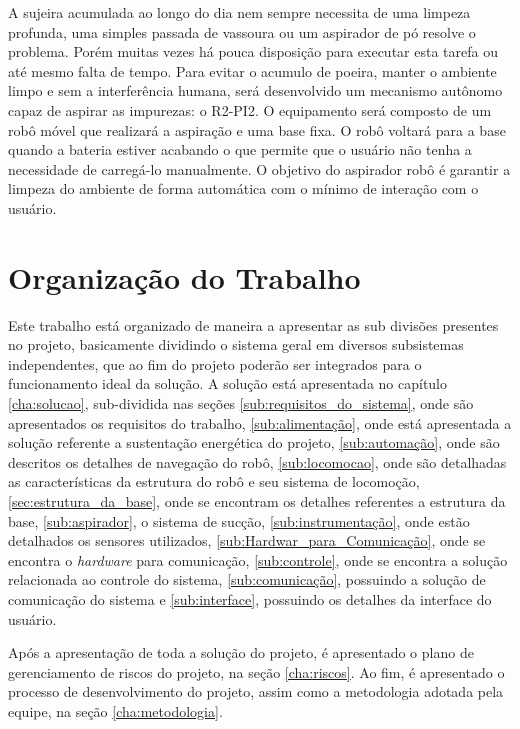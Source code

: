 A sujeira acumulada ao longo do dia nem sempre necessita de uma limpeza profunda, uma simples
passada de vassoura ou um aspirador de pó resolve o problema. Porém muitas vezes há pouca
disposição para executar esta tarefa ou até mesmo falta de tempo. Para evitar o acumulo de
poeira, manter o ambiente limpo e sem a interferência humana, será desenvolvido um mecanismo 
autônomo capaz de aspirar as impurezas: o R2-PI2. O equipamento será composto de um robô móvel que realizará a aspiração e uma base fixa. O robô voltará para a base quando a bateria estiver acabando o que permite que o usuário não tenha a necessidade de carregá-lo manualmente. O objetivo do aspirador robô é garantir a limpeza do ambiente de forma automática com o mínimo de interação com o usuário.











\section{Organização do Trabalho} %
\label{sub:organização_do_trabalho}
	
	Este trabalho está organizado de maneira a apresentar as sub divisões presentes no projeto, basicamente dividindo o sistema geral em diversos subsistemas independentes, que ao fim do projeto poderão ser integrados para o funcionamento ideal da solução. A solução está apresentada no capítulo \ref{cha:solucao}, sub-dividida nas seções \ref{sub:requisitos_do_sistema}, onde são apresentados os requisitos do trabalho, \ref{sub:alimentação}, onde está apresentada a solução referente a sustentação energética do projeto, \ref{sub:automação}, onde são descritos os detalhes de navegação do robô, \ref{sub:locomocao}, onde são detalhadas as características da estrutura do robô e seu sistema de locomoção, \ref{sec:estrutura_da_base}, onde se encontram os detalhes referentes a estrutura da base, \ref{sub:aspirador}, o sistema de sucção, \ref{sub:instrumentação}, onde estão detalhados os sensores utilizados, \ref{sub:Hardwar_para_Comunicação}, onde se encontra o \textit{hardware} para comunicação, \ref{sub:controle}, onde se encontra a solução relacionada ao controle do sistema, \ref{sub:comunicação}, possuindo a solução de comunicação do sistema e \ref{sub:interface}, possuindo os detalhes da interface do usuário.

	Após a apresentação de toda a solução do projeto, é apresentado o plano de gerenciamento de riscos do projeto, na seção \ref{cha:riscos}. Ao fim, é apresentado o processo de desenvolvimento do projeto, assim como a metodologia adotada pela equipe, na seção \ref{cha:metodologia}.
